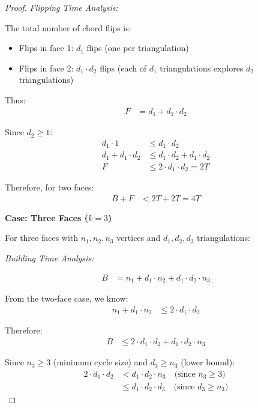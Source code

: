 \documentclass[12pt,a4paper]{article}
\theoremstyle{definition}
\theoremstyle{remark}
\begin{document}
\begin{proof}
\textit{Flipping Time Analysis:}

The total number of chord flips is:
\begin{itemize}
    \item Flips in face 1: $d_1$ flips (one per triangulation)
    \item Flips in face 2: $d_1 \cdot d_2$ flips (each of $d_1$ triangulations explores $d_2$ triangulations)
\end{itemize}

Thus:
\begin{align}
F &= d_1 + d_1 \cdot d_2
\end{align}

Since $d_2 \geq 1$:
\begin{align}
d_1 \cdot 1 &\leq d_1 \cdot d_2 \\
d_1 + d_1 \cdot d_2 &\leq d_1 \cdot d_2 + d_1 \cdot d_2 \\
F &\leq 2 \cdot d_1 \cdot d_2 = 2T
\end{align}

Therefore, for two faces:
\begin{align}
B + F &< 2T + 2T = 4T
\end{align}

\vspace{0.3cm}
\noindent\textbf{Case: Three Faces ($k = 3$)}

For three faces with $n_1, n_2, n_3$ vertices and $d_1, d_2, d_3$ triangulations:

\textit{Building Time Analysis:}

\begin{align}
B &= n_1 + d_1 \cdot n_2 + d_1 \cdot d_2 \cdot n_3
\end{align}

From the two-face case, we know:
\begin{align}
n_1 + d_1 \cdot n_2 &\leq 2 \cdot d_1 \cdot d_2
\end{align}

Therefore:
\begin{align}
B &\leq 2 \cdot d_1 \cdot d_2 + d_1 \cdot d_2 \cdot n_3
\end{align}

Since $n_3 \geq 3$ (minimum cycle size) and $d_3 \geq n_3$ (lower bound):
\begin{align}
2 \cdot d_1 \cdot d_2 &< d_1 \cdot d_2 \cdot n_3 \quad \text{(since $n_3 \geq 3$)} \\
&\leq d_1 \cdot d_2 \cdot d_3 \quad \text{(since $d_3 \geq n_3$)}
\end{align}


\end{proof}
\end{document}
